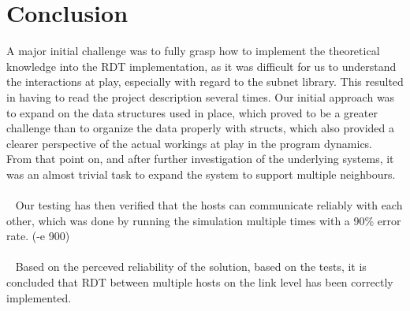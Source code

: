 \section{Conclusion}
A major initial challenge was to fully grasp how to implement the theoretical knowledge into the RDT implementation, as it was difficult for us to understand the interactions at play, especially with regard to the subnet library. This resulted in having to read the project description several times.
Our initial approach was to expand on the data structures used in place, which proved to be a greater challenge than to organize the data properly with structs, which also provided a clearer perspective of the actual workings at play in the program dynamics.\\
From that point on, and after further investigation of the underlying systems, it was an almost trivial task to expand the system to support multiple neighbours.\\
\\~
Our testing has then verified that the hosts can communicate reliably with each other, which was done by running the simulation multiple times with a 90\% error rate. (-e 900)\\
\\~
Based on the perceved reliability of the solution, based on the tests, it is concluded that RDT between multiple hosts on the link level has been correctly implemented.
